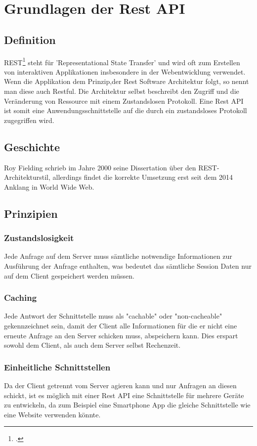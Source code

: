 \chapter{Grundlagen der Rest API}
\bauer
\section{Definition} 
REST\footcite{rest} steht für 'Representational State Transfer' und wird oft zum Erstellen von interaktiven Applikationen insbesondere in der Webentwicklung verwendet. Wenn die Applikation dem Prinzip,der Rest Software Architektur folgt, so nennt man diese auch Restful. Die Architektur selbst beschreibt den Zugriff und die Veränderung von Ressource mit einem Zustandslosen Protokoll. Eine Rest API ist somit eine Anwendungsschnittstelle auf die durch ein zustandsloses Protokoll zugegriffen wird.			
\section{Geschichte}
Roy Fielding schrieb im Jahre 2000 seine Dissertation über den REST-Architekturstil, allerdings findet die korrekte Umsetzung erst seit dem 2014 Anklang in World Wide Web.		 	
\section{Prinzipien}		 				 	
\subsection{Zustandslosigkeit}
Jede Anfrage auf dem Server muss sämtliche notwendige Informationen zur Ausführung der Anfrage enthalten, was bedeutet das sämtliche Session Daten nur auf dem Client gespeichert werden müssen.		 	
\subsection{Caching}
Jede Antwort der Schnittstelle muss als "cachable" oder "non-cacheable" gekennzeichnet sein, damit der Client alle Informationen für die er nicht eine erneute Anfrage an den Server schicken muss, abspeichern kann. Dies erspart sowohl dem Client, als auch dem Server selbst Rechenzeit.		 	
\subsection{Einheitliche Schnittstellen}
Da der Client getrennt vom Server agieren kann und nur Anfragen an diesen schickt, ist es möglich mit einer Rest API eine Schnittstelle für mehrere Geräte zu entwickeln, da zum Beispiel eine Smartphone App die gleiche Schnittstelle wie eine Website verwenden könnte.		 	
